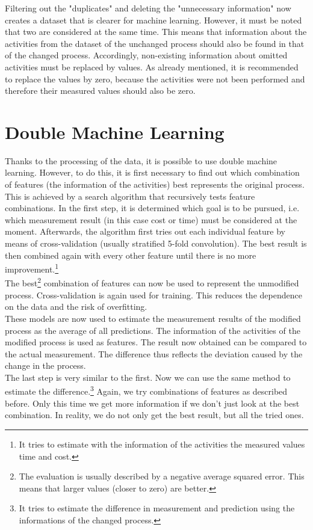     Filtering out the "duplicates" and deleting the "unnecessary information" now creates a dataset that is clearer for machine learning. However, it must be noted that two are considered at the same time. This means that information about the activities from the dataset of the unchanged process should also be found in that of the changed process. Accordingly, non-existing information about omitted activities must be replaced by values. As already mentioned, it is recommended to replace the values by zero, because the activities were not been performed and therefore their measured values should also be zero.

    \section{Double Machine Learning}
    Thanks to the processing of the data, it is possible to use double machine learning. However, to do this, it is first necessary to find out which combination of features (the information of the activities) best represents the original process. This is achieved by a search algorithm that recursively tests feature combinations. In the first step, it is determined which goal is to be pursued, i.e. which measurement result (in this case cost or time) must be considered at the moment. Afterwards, the algorithm first tries out each individual feature by means of cross-validation (usually stratified 5-fold convolution). The best result is then combined again with every other feature until there is no more improvement.\footnote{It tries to estimate with the information of the activities the measured values time and cost.}\\
    The best\footnote{The evaluation is usually described by a negative average squared error. This means that larger values (closer to zero) are better.} combination of features can now be used to represent the unmodified process. Cross-validation is again used for training. This reduces the dependence on the data and the risk of overfitting.\\
    These models are now used to estimate the measurement results of the modified process as the average of all predictions. The information of the activities of the modified process is used as features. The result now obtained can be compared to the actual measurement. The difference thus reflects the deviation caused by the change in the process.\\
    The last step is very similar to the first. Now we can use the same method to estimate the difference.\footnote{It tries to estimate the difference in measurement and prediction using the informations of the changed process.} Again, we try combinations of features as described before. Only this time we get more information if we don't just look at the best combination. In reality, we do not only get the best result, but all the tried ones.\\
